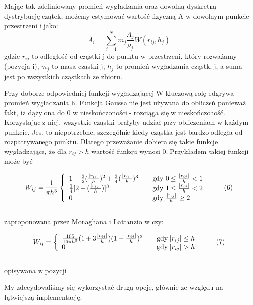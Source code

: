 \documentclass[polish, 12pt]{aghthesis}
\begin{document}
			Mając tak zdefiniowany promień wygładzania oraz dowolną dyskretną dystrybucję czątek, możemy estymować wartość fizyczną A w dowolnym punkcie przestrzeni i jako: \[{A}_i=\sum_{j=1}^{N}m_j\frac{A_j}{\rho_j}W(r_{ij},h_j) \label{eq:calc_all} \tag{5}\] gdzie ${r_{ij}}$ to odległość od cząstki j do punktu w przestrzeni, który rozważamy (pozycja i), ${m_j}$ to masa cząstki j, ${h_j}$ to promień wygładzania cząstki j, a suma jest po wszystkich cząstkach ze zbioru. 
			
			
			Przy doborze odpowiedniej funkcji wygładzającej W kluczową rolę odgrywa promień wygładzania h. Funkcja Gaussa nie jest używana do obliczeń ponieważ fakt, iż dąży ona do 0 w nieskończoności - rozciąga się w nieskończoność. Korzystając z niej, wszystkie cząstki brałyby udział przy obliczeniach w każdym punkcie. Jest to niepotrzebne, szczególnie kiedy cząstka jest bardzo odległa od rozpatrywanego punktu. Dlatego przeważanie dobiera się takie funkcje wygładzające, że dla ${r_{ij} > h}$ wartość funkcji wynosi 0. Przykładem takiej funkcji może być
			
			\[ W_{ij} = \frac{1}{\pi h^3} \left\{ 
				\begin{array}{l l l}
					1 - \frac{3}{2}(\frac{|r_{ij}|}{h})^2 + \frac{3}{4}(\frac{|r_{ij}|}{h})^3  & \quad \text{gdy ${0 \leq \frac{|r_{ij}|}{h} < 1}$}  \\ 
					\frac{1}{4}[2 - (\frac{|r_{ij}|}{h})]^3  & \quad \text{gdy ${1 \leq \frac{|r_{ij}|}{h} < 2}$}  \\ 
					0 & \quad \text{gdy ${\frac{|r_{ij}|}{h} \geq 2 }$} 
				\end{array} \right.\ \label{eq:kernel_function} \tag{6}\]
			\ \\
			zaproponowana przez Monaghana i Lattanzio w \cite{MonLat} czy:
			
			\[ W_{ij} = \left\{
				\begin{array}{l l}
					\frac{105}{16 \pi h^5}(1 + 3 \frac{|r_{ij}|}{h})(1-\frac{|r_{ij}|}{h})^3 & \quad \text{gdy ${|r_{ij}| \leq h}$}  \\ 0 & \quad \text{gdy ${|r_{ij}| > h}$} 
				\end{array} \right.\ \label{eq:kernel_function} \tag{7}\]
			\ \\
			opisywana w pozycji \cite{Lucy}
			
			My zdecydowaliśmy się wykorzystać drugą opcję, głównie ze względu na łątwiejszą implementację. 
			
\end{document}
